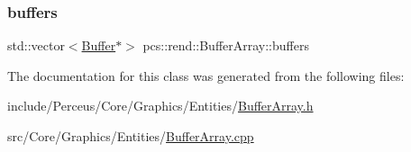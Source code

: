\subsubsection{\texorpdfstring{buffers}{buffers}}
{\footnotesize\ttfamily std\+::vector$<$\hyperlink{classpcs_1_1rend_1_1Buffer}{Buffer}$\ast$$>$ pcs\+::rend\+::\+Buffer\+Array\+::buffers\hspace{0.3cm}{\ttfamily [private]}}



The documentation for this class was generated from the following files\+:\begin{DoxyCompactItemize}
\item 
include/\+Perceus/\+Core/\+Graphics/\+Entities/\hyperlink{BufferArray_8h}{Buffer\+Array.\+h}\item 
src/\+Core/\+Graphics/\+Entities/\hyperlink{BufferArray_8cpp}{Buffer\+Array.\+cpp}\end{DoxyCompactItemize}
